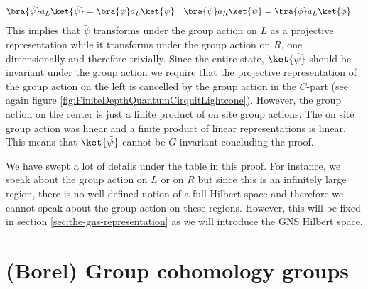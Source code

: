 \begin{align}
	\bra{\tilde{\psi}}a_L\ket{\tilde{\psi}}&=\bra{\psi}a_L\ket{\psi}&\bra{\tilde{\psi}}a_R\ket{\tilde{\psi}}&=\bra{\phi}a_L\ket{\phi}.
\end{align}
This implies that $\tilde{\psi}$ transforms under the group action on $L$ as a projective representation while it transforms under the group action on $R$, one dimensionally and therefore trivially. Since the entire state, $\ket{\tilde{\psi}}$ should be invariant under the group action we require that the projective representation of the group action on the left is cancelled by the group action in the $C$-part (see again figure \ref{fig:FiniteDepthQuantumCirquitLightcone}). However, the group action on the center is just a finite product of on site group actions. The on site group action was linear and a finite product of linear representations is linear. This means that $\ket{\tilde{\psi}}$ cannot be $G$-invariant concluding the proof.
\begin{remark}
	We have swept a lot of details under the table in this proof. For instance, we speak about the group action on $L$ or on $R$ but since this is an infinitely large region, there is no well defined notion of a full Hilbert space and therefore we cannot speak about the group action on these regions. However, this will be fixed in section \ref{sec:the-gns-representation} as we will introduce the GNS Hilbert space.
\end{remark}
\section{(Borel) Group cohomology groups}
